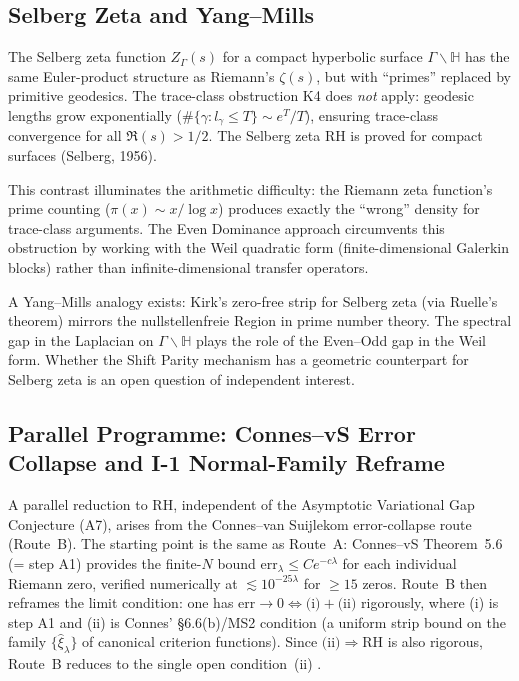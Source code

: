 \documentclass[12pt,a4paper]{article}
\theoremstyle{definition}
\theoremstyle{remark}
\begin{document}
\subsection{Selberg Zeta and Yang--Mills}

The Selberg zeta function $Z_\Gamma(s)$ for a compact hyperbolic surface $\Gamma \backslash \mathbb{H}$ has the same Euler-product structure as Riemann's $\zeta(s)$, but with ``primes'' replaced by primitive geodesics. The trace-class obstruction K4 does \emph{not} apply: geodesic lengths grow exponentially ($\#\{\gamma: l_\gamma \leq T\} \sim e^T/T$), ensuring trace-class convergence for all $\Re(s) > 1/2$. The Selberg zeta RH is proved for compact surfaces (Selberg, 1956).

This contrast illuminates the arithmetic difficulty: the Riemann zeta function's prime counting ($\pi(x) \sim x/\log x$) produces exactly the ``wrong'' density for trace-class arguments. The Even Dominance approach circumvents this obstruction by working with the Weil quadratic form (finite-dimensional Galerkin blocks) rather than infinite-dimensional transfer operators.

A Yang--Mills analogy exists: Kirk's zero-free strip for Selberg zeta (via Ruelle's theorem) mirrors the nullstellenfreie Region in prime number theory. The spectral gap in the Laplacian on $\Gamma \backslash \mathbb{H}$ plays the role of the Even--Odd gap in the Weil form. Whether the Shift Parity mechanism has a geometric counterpart for Selberg zeta is an open question of independent interest.

\subsection{Parallel Programme: Connes--vS Error Collapse and I-1 Normal-Family Reframe}
\label{sec:parallel-route-b}

A parallel reduction to RH, independent of the Asymptotic Variational Gap Conjecture (A7), arises from the Connes--van Suijlekom error-collapse route (Route~B).
The starting point is the same as Route~A: Connes--vS Theorem~5.6 (= step A1) provides the finite-$N$ bound
$\mathrm{err}_\lambda \leq C e^{-c\lambda}$ for each individual Riemann zero, verified numerically
at $\lesssim 10^{-25\lambda}$ for $\geq 15$ zeros.
Route~B then reframes the limit condition: one has
$\mathrm{err} \to 0 \Longleftrightarrow \text{(i)} + \text{(ii)}$
rigorously, where (i) is step A1 and (ii) is Connes' \S6.6(b)/MS2 condition (a
uniform strip bound on the family $\{\hat\xi_\lambda\}$ of canonical criterion
functions).
Since $\text{(ii)} \Rightarrow \mathrm{RH}$ is also rigorous, Route~B
reduces to the single open condition~(ii) \cite{Geiger2026evendom}.
\end{document}
